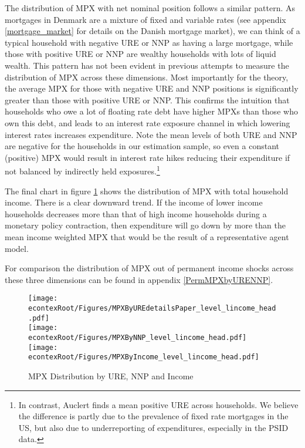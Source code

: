\documentclass[titlepage]{\econtex}\newcommand{\texname}{ConsumptionHeterogeneity}
\begin{document}
The distribution of MPX with net nominal position follows a similar pattern. As mortgages in Denmark are a mixture of fixed and variable rates (see appendix \ref{mortgage_market} for details on the Danish mortgage market), we can think of a typical household with negative URE or NNP as having a large mortgage, while those with positive URE or NNP are wealthy households with lots of liquid wealth. This pattern has not been evident in previous attempts to measure the distribution of MPX across these dimensions. Most importantly for the theory, the average MPX for those with negative URE and NNP positions is significantly greater than those with positive URE or NNP. This confirms the intuition that households who owe a lot of floating rate debt have higher MPXs than those who own this debt, and leads to an interest rate exposure channel in which lowering interest rates increases expenditure. Note the mean levels of both URE and NNP are negative for the households in our estimation sample, so even a constant (positive) MPX would result in interest rate hikes reducing their expenditure if not balanced by indirectly held exposures.\footnote{In contrast, Auclert finds a mean positive URE across households. We believe the difference is partly due to the prevalence of fixed rate mortgages in the US, but also due to underreporting of expenditures, especially in the PSID data.}

The final chart in figure \ref{fig:MPCAuclert} shows the distribution of MPX with total household income. There is a clear downward trend. If the income of lower income households decreases more than that of high income households during a monetary policy contraction, then expenditure will go down by more than the mean income weighted MPX that would be the result of a representative agent model.

For comparison the distribution of  MPX out of permanent income shocks across these three dimensions can be found in appendix \ref{PermMPXbyURENNP}.
\begin{figure} 
\begin{centering}
	\texttt{[image: \\econtexRoot/Figures/MPXByUREdetailsPaper\_level\_lincome\_head.pdf]} \\
	\texttt{[image: \\econtexRoot/Figures/MPXByNNP\_level\_lincome\_head.pdf]}
	\texttt{[image: \\econtexRoot/Figures/MPXByIncome\_level\_lincome\_head.pdf]}
	\caption{MPX Distribution by URE, NNP and Income}
	\label{fig:MPCAuclert}
\end{centering}
\end{figure}
\end{document}
